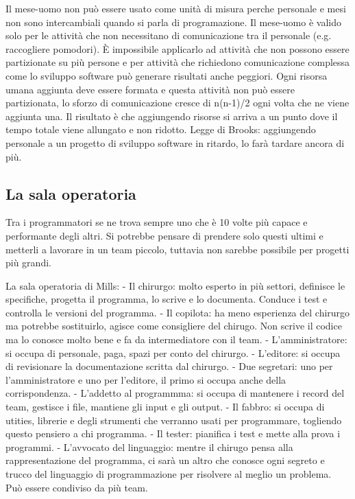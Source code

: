 \documentclass[a4paper,12pt,titlepage,oneside]{book}
\begin{document}
Il mese-uomo non può essere usato come unità di misura perche personale e mesi non sono intercambiali quando si parla di programazione. Il mese-uomo è valido solo per le attività che non necessitano di comunicazione tra il personale (e.g. raccogliere pomodori). È impossibile applicarlo ad attività che non possono essere partizionate su più persone e per attività che richiedono comunicazione complessa come lo sviluppo software può generare risultati anche peggiori.
Ogni risorsa umana aggiunta deve essere formata e questa attività non può essere partizionata, lo sforzo di comunicazione cresce di n(n-1)/2 ogni volta che ne viene aggiunta una.
Il risultato è che aggiungendo risorse si arriva a un punto dove il tempo totale viene allungato e non ridotto.
Legge di Brooks: aggiungendo personale a un progetto di sviluppo software in ritardo, lo farà tardare ancora di più.

\subsection{La sala operatoria}
Tra i programmatori se ne trova sempre uno che è 10 volte più capace e performante degli altri. Si potrebbe pensare di prendere solo questi ultimi e metterli a lavorare in un team piccolo, tuttavia non sarebbe possibile per progetti più grandi.

La sala operatoria di Mills:
- Il chirurgo: molto esperto in più settori, definisce le specifiche, progetta il programma, lo scrive e lo documenta. Conduce i test e controlla le versioni del programma.
- Il copilota: ha meno esperienza del chirurgo ma potrebbe sostituirlo, agisce come consigliere del chirugo. Non scrive il codice ma lo conosce molto bene e fa da intermediatore con il team.
- L'amministratore: si occupa di personale, paga, spazi per conto del chirurgo.
- L'editore: si occupa di revisionare la documentazione scritta dal chirurgo.
- Due segretari: uno per l'amministratore e uno per l'editore, il primo si occupa anche della corrispondenza.
- L'addetto al programmma: si occupa di mantenere i record del team, gestisce i file, mantiene gli input e gli output.
- Il fabbro: si occupa di utities, librerie e degli strumenti che verranno usati per programmare, togliendo questo pensiero a chi programma.
- Il tester: pianifica i test e mette alla prova i programmi.
- L'avvocato del linguaggio: mentre il chirugo pensa alla rappresentazione del programma, ci sarà un altro che conosce ogni segreto e trucco del linguaggio di programmazione per risolvere al meglio un problema. Può essere condiviso da più team.
\end{document}
